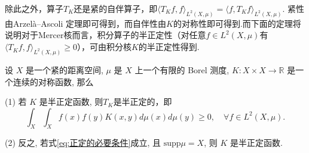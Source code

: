 \documentclass[../master.tex]{subfiles}
\begin{document}
除此之外，算子$T_K$还是紧的自伴算子，即$\langle T_Kf,f\rangle_{L^2(X,\mu)}=\langle f,T_Kf\rangle_{L^2(X,\mu)}$. 紧性由Arzelà–Ascoli 定理即可得到，而自伴性由$K$的对称性即可得到.而下面的定理将说明对于Mercer核而言，积分算子的半正定性（对任意$f\in L^2(X,\mu)$有$\langle T_Kf,f\rangle_{L^2(X,\mu)}\geq 0$），可由积分核$K$的半正定性得到.
\begin{theorem}[核积分算子的半正定性]\label{thm:基于Mercer核的积分算子的半正定性}
    设 $X$ 是一个紧的距离空间, $\mu$ 是 $X$ 上一个有限的 Borel 测度, $K: X \times X \to \mathbb{R}$ 是一个连续的对称函数, 那么

(1) 若 $K$ 是半正定函数, 则$T_K$是半正定的，即
\begin{equation}\label{eq:正定的必要条件}
    \int_X \int_X f(x)f(y)K(x,y)d\mu(x)d\mu(y) \geq 0, \quad \forall f \in L^2(X,\mu).
\end{equation}

(2) 反之, 若式\eqref{eq:正定的必要条件}成立, 且 $\text{supp}\mu = X$, 则 $K$ 是半正定函数.
\end{theorem}
\end{document}

